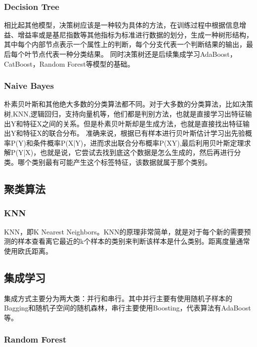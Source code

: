 \documentclass[../main.tex]{subfiles}
\begin{document}
        \subsubsection{Decision Tree}

            相比起其他模型，决策树应该是一种较为具体的方法，在训练过程中根据信息增益、增益率或是基尼指数等其他指标为标准进行数据的划分，生成一种树形结构，其中每个内部节点表示一个属性上的判断，每个分支代表一个判断结果的输出，最后每个叶节点代表一种分类结果。
            同时决策树还是后续集成学习AdaBoost，CatBoost，Random Forest等模型的基础。
        
        \subsubsection{Naive Bayes}

            朴素贝叶斯和其他绝大多数的分类算法都不同。对于大多数的分类算法，比如决策树,KNN,逻辑回归，支持向量机等，他们都是判别方法，也就是直接学习出特征输出Y和特征X之间的关系。但是朴素贝叶斯却是生成方法，也就是直接找出特征输出Y和特征X的联合分布。
            准确来说，根据已有样本进行贝叶斯估计学习出先验概率P(Y)和条件概率P(X|Y)，进而求出联合分布概率P(XY),最后利用贝叶斯定理求解P(Y|X)，也就是说，它尝试去找到底这个数据是怎么生成的，然后再进行分类。哪个类别最有可能产生这个标签特征，该数据就属于那个类别。

    \subsection{聚类算法}
    
        \subsubsection{KNN}

            KNN，即K Nearest Neighbors。KNN的原理非常简单，就是对于每个新的需要预测的样本查看离它最近的k个样本的类别来判断该样本是什么类别。距离度量通常使用欧氏距离。

    \subsection{集成学习}

        集成方式主要分为两大类：并行和串行。其中并行主要有使用随机子样本的Bagging和随机子空间的随机森林，串行主要使用Boosting，代表算法有AdaBoost等。

        \subsubsection{Random Forest}
\end{document}
